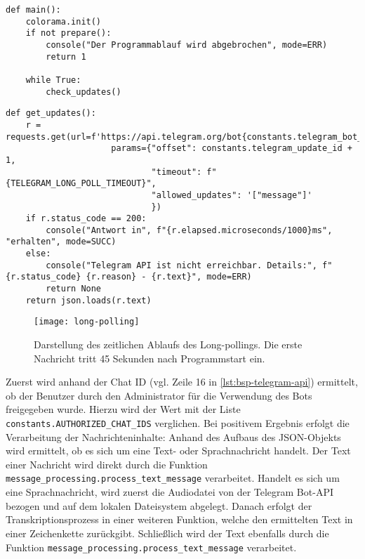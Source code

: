 \begin{lstlisting}[caption={Programmcode der Hauptfunktion ohne Kommentare und Ausgaben zur Fehleranalyse}, label=lst:code-main, numbers=none]
def main():
    colorama.init()
    if not prepare():
        console("Der Programmablauf wird abgebrochen", mode=ERR)
        return 1

    while True:
        check_updates()
\end{lstlisting}

\begin{lstlisting}[caption={Programmcode der Funktion für den Abruf von Aktualisierungen von der Telegram Bot API ohne Kommentare und Ausgaben zur Fehleranalyse}, label=lst:code-updates, numbers=none]
def get_updates():
    r = requests.get(url=f'https://api.telegram.org/bot{constants.telegram_bot_token}/getUpdates',
                     params={"offset": constants.telegram_update_id + 1,
                             "timeout": f"{TELEGRAM_LONG_POLL_TIMEOUT}",
                             "allowed_updates": '["message"]'
                             })
    if r.status_code == 200:
        console("Antwort in", f"{r.elapsed.microseconds/1000}ms", "erhalten", mode=SUCC)
    else:
        console("Telegram API ist nicht erreichbar. Details:", f"{r.status_code} {r.reason} - {r.text}", mode=ERR)
        return None
    return json.loads(r.text)
\end{lstlisting}

\begin{figure}[h!]
\centering
\texttt{[image: long-polling]}
\caption{Darstellung des zeitlichen Ablaufs des Long-pollings. Die erste Nachricht tritt 45 Sekunden nach Programmstart ein.}
\label{fig:long-polling}
\end{figure}

Zuerst wird anhand der Chat ID (vgl. Zeile 16 in \autoref{lst:bsp-telegram-api}) ermittelt, ob der Benutzer durch den Administrator für die Verwendung des Bots freigegeben wurde. Hierzu wird der Wert mit der Liste \lstinline{constants.AUTHORIZED_CHAT_IDS} verglichen. Bei positivem Ergebnis erfolgt die Verarbeitung der Nachrichteninhalte: Anhand des Aufbaus des JSON-Objekts wird ermittelt, ob es sich um eine Text- oder Sprachnachricht handelt. Der Text einer Nachricht wird direkt durch die Funktion \lstinline{message_processing.process_text_message} verarbeitet. Handelt es sich um eine Sprachnachricht, wird zuerst die Audiodatei von der Telegram Bot-API bezogen und auf dem lokalen Dateisystem abgelegt. Danach erfolgt der Transkriptionsprozess in einer weiteren Funktion, welche den ermittelten Text in einer Zeichenkette zurückgibt. Schließlich wird der Text ebenfalls durch die Funktion \lstinline{message_processing.process_text_message} verarbeitet.


